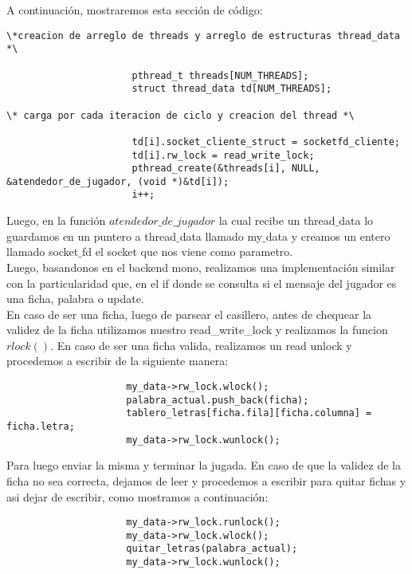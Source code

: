 A continuación, mostraremos esta sección de código:\\
\begin{verbatim}
\*creacion de arreglo de threads y arreglo de estructuras thread_data *\

                      pthread_t threads[NUM_THREADS];
                      struct thread_data td[NUM_THREADS];
                      
\* carga por cada iteracion de ciclo y creacion del thread *\

                      td[i].socket_cliente_struct = socketfd_cliente;
                      td[i].rw_lock = read_write_lock;
                      pthread_create(&threads[i], NULL, &atendedor_de_jugador, (void *)&td[i]);
                      i++;
\end{verbatim}

Luego, en la función $atendedor\_de\_jugador$ la cual recibe un thread$\_$data lo guardamos en un puntero a thread$\_$data llamado
my$\_$data y creamos un entero llamado socket$\_$fd el socket que nos viene como parametro.\\

Luego, basandonos en el backend mono, realizamos una implementación similar con la particularidad que, en el if donde se
consulta si el mensaje del jugador es una ficha, palabra o update.\\
En caso de ser una ficha, luego de parsear el casillero, antes de chequear la validez de la ficha utilizamos nuestro read\_write\_lock y realizamos
la funcion $rlock()$. En caso de ser una ficha valida, realizamos un read unlock y procedemos a escribir de la siguiente manera:\\
\begin{verbatim}
                     my_data->rw_lock.wlock();
                     palabra_actual.push_back(ficha);
                     tablero_letras[ficha.fila][ficha.columna] = ficha.letra;
                     my_data->rw_lock.wunlock(); 
\end{verbatim}
Para luego enviar la misma y terminar la jugada. En caso de que la validez de la ficha no sea correcta, dejamos de leer
y procedemos a escribir para quitar fichas y asi dejar de escribir, como mostramos a continuación:\\

\begin{verbatim}
                     my_data->rw_lock.runlock();
                     my_data->rw_lock.wlock();
                     quitar_letras(palabra_actual);
                     my_data->rw_lock.wunlock(); 
\end{verbatim}

